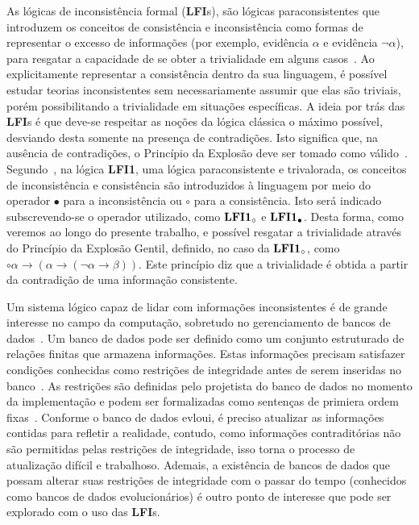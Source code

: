 As lógicas de inconsistência formal (\textbf{LFI}s), são lógicas paraconsistentes que introduzem  os conceitos de consistência e inconsistência como formas de representar o excesso de informações (por exemplo, evidência  $\alpha$ e evidência  $\neg \alpha$), para resgatar a capacidade de se obter a trivialidade em alguns casos~\cite{carnielli2007}. Ao explicitamente representar a consistência dentro da sua linguagem, é possível estudar teorias inconsistentes sem necessariamente assumir que elas são triviais, porém possibilitando a trivialidade em situações específicas. A ideia por trás das \textbf{LFI}s é que deve-se respeitar as noções da lógica clássica o máximo possível, desviando desta somente na presença de contradições. Isto significa que, na ausência de contradições, o Princípio da Explosão deve ser tomado como válido~\cite{sep-logic-paraconsistent}. Segundo~\cite{Carnielli_Coniglio_2016,new_advances_lfi}, na lógica \textbf{LFI1}, uma lógica paraconsistente e trivalorada, os conceitos de inconsistência e consistência são introduzidos à linguagem por meio do operador $\bullet$ para a inconsistência ou $\circ$ para a consistência. Isto será indicado subscrevendo-se o operador utilizado, como $\text{\textbf{LFI1}}_{\circ}$ e $\text{\textbf{LFI1}}_{\bullet}$. Desta forma, como veremos ao longo do presente trabalho, e possível resgatar a trivialidade através do Princípio da Explosão Gentil, definido, no caso da $\text{\textbf{LFI1}}_{\circ}$, como $\circ \alpha \rightarrow (\alpha \rightarrow (\neg \alpha \rightarrow \beta))$\cite{carnielli2007}. Este princípio diz que a trivialidade é obtida a partir da contradição de uma informação consistente.

Um sistema lógico capaz de lidar com informações inconsistentes é de grande interesse no campo da computação, sobretudo no gerenciamento de bancos de dados~\cite{carnielli2000formal}. Um banco de dados pode ser definido como um conjunto estruturado de relações finitas que armazena informações. Estas informações precisam satisfazer condições conhecidas como restrições de integridade antes de serem inseridas no banco~\cite{Codd}. As restrições são definidas pelo projetista do banco de dados no momento da implementação e podem ser formalizadas como sentenças de primiera ordem fixas~\cite{carnielli2000formal}. Conforme o banco de dados evloui, é preciso atualizar as informações contidas para refletir a realidade, contudo, como informações contraditórias não são permitidas pelas restrições de integridade, isso torna o processo de atualização difícil e trabalhoso. Ademais, a existência de bancos de dados que possam alterar suas restrições de integridade com o passar do tempo (conhecidos como bancos de dados evolucionários) é outro ponto de interesse que pode ser explorado com o uso das \textbf{LFI}s.

